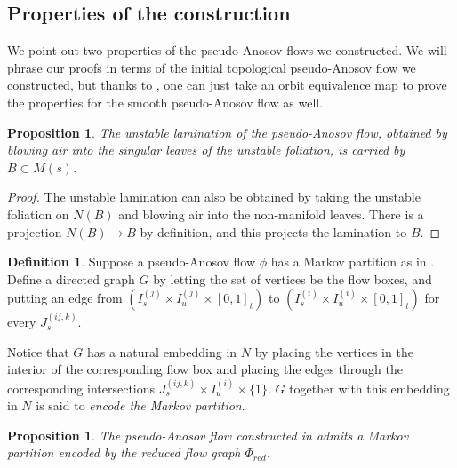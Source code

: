 \documentclass[12pt]{amsart}
\newtheorem{prop}[thm]{Proposition}
\theoremstyle{definition}
\newtheorem{defn}[thm]{Definition}
\numberwithin{equation}{section}
\begin{document}
\subsection{Properties of the construction} \label{subsec:prop}

We point out two properties of the pseudo-Anosov flows we constructed. We will phrase our proofs in terms of the initial topological pseudo-Anosov flow we constructed, but thanks to , one can just take an orbit equivalence map to prove the properties for the smooth pseudo-Anosov flow as well.

\begin{prop} \label{prop:unstablelamination}
The unstable lamination of the pseudo-Anosov flow, obtained by blowing air into the singular leaves of the unstable foliation, is carried by $B \subset M(s)$.
\end{prop}

\begin{proof}
The unstable lamination can also be obtained by taking the unstable foliation on $N(B)$ and blowing air into the non-manifold leaves. There is a projection $N(B) \to B$ by definition, and this projects the lamination to $B$.
\end{proof}

\begin{defn}
Suppose a pseudo-Anosov flow $\phi$ has a Markov partition as in . Define a directed graph $G$ by letting the set of vertices be the flow boxes, and putting an edge from $(I^{(j)}_s \times I^{(j)}_u \times [0,1]_t)$ to $(I^{(i)}_s \times I^{(i)}_u \times [0,1]_t)$ for every $J^{(ij,k)}_s$. 

Notice that $G$ has a natural embedding in $N$ by placing the vertices in the interior of the corresponding flow box and placing the edges through the corresponding intersections $J^{(ij,k)}_s \times I^{(i)}_u \times \{1\}$. $G$ together with this embedding in $N$ is said to \textit{encode the Markov partition}. 
\end{defn}

\begin{prop} \label{prop:Markovpart}
The pseudo-Anosov flow constructed in  admits a Markov partition encoded by the reduced flow graph $\Phi_{red}$.
\end{prop}
\end{document}
